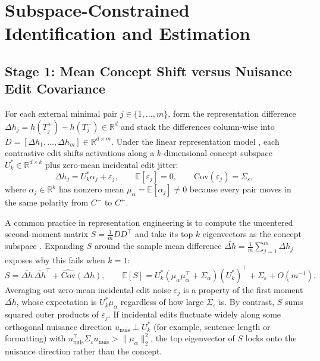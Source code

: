 \documentclass[11pt]{article}
\begin{document}
\section{Subspace-Constrained Identification and Estimation}

\subsection{Stage 1: Mean Concept Shift versus Nuisance Edit Covariance}

For each external minimal pair $j \in \{1, \dots, m\}$, form the representation difference $\Delta h_j = h(T_j^+) - h(T_j^-) \in \mathbb{R}^d$ and stack the differences column-wise into $D = [\Delta h_1, \dots, \Delta h_m] \in \mathbb{R}^{d \times m}$. Under the linear representation model \citep{park2023linear,zou2023representation}, each contrastive edit shifts activations along a $k$-dimensional concept subspace $U_k^* \in \mathbb{R}^{d \times k}$ plus zero-mean incidental edit jitter:
\begin{equation}\label{eq:edit_model}
\Delta h_j = U_k^* \alpha_j + \varepsilon_j, \qquad \mathbb{E}[\varepsilon_j] = 0, \qquad \mathrm{Cov}(\varepsilon_j) = \Sigma_\varepsilon,
\end{equation}
where $\alpha_j \in \mathbb{R}^k$ has nonzero mean $\mu_\alpha = \mathbb{E}[\alpha_j] \neq 0$ because every pair moves in the same polarity from $C^-$ to $C^+$.

A common practice in representation engineering is to compute the uncentered second-moment matrix $S = \frac{1}{m}DD^\top$ and take its top $k$ eigenvectors as the concept subspace \citep{zou2023representation}. Expanding $S$ around the sample mean difference $\bar{\Delta h} = \frac{1}{m}\sum_{j=1}^m \Delta h_j$ exposes why this fails when $k = 1$:
\begin{equation}\label{eq:S_decomp}
S = \bar{\Delta h}\,\bar{\Delta h}^\top + \widehat{\mathrm{Cov}}(\Delta h), \qquad \mathbb{E}[S] = U_k^*(\mu_\alpha\mu_\alpha^\top + \Sigma_\alpha)(U_k^*)^\top + \Sigma_\varepsilon + O(m^{-1}).
\end{equation}
Averaging out zero-mean incidental edit noise $\varepsilon_j$ is a property of the first moment $\bar{\Delta h}$, whose expectation is $U_k^*\mu_\alpha$ regardless of how large $\Sigma_\varepsilon$ is. By contrast, $S$ sums squared outer products of $\varepsilon_j$. If incidental edits fluctuate widely along some orthogonal nuisance direction $u_{\mathrm{nuis}} \perp U_k^*$ (for example, sentence length or formatting) with $u_{\mathrm{nuis}}^\top \Sigma_\varepsilon u_{\mathrm{nuis}} > \|\mu_\alpha\|_2^2$, the top eigenvector of $S$ locks onto the nuisance direction rather than the concept.
\end{document}
